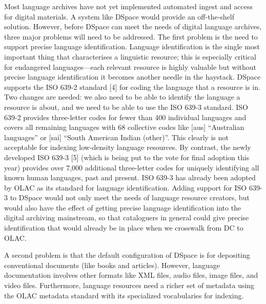 Most language archives have not yet implemented automated ingest and
access for digital materials.  A system like DSpace would provide 
an off-the-shelf solution.  
However, before DSpace can meet the needs of digital language archives,
three major problems will need to be addressed.
The first problem is the need to support precise language identification.
Language identification is the single most important thing that
characterises a linguistic resource; this is especially critical for
endangered languages---each relevant resource is highly valuable but
without precise language identification it becomes another needle in
the haystack. DSpace supports the ISO 639-2 standard [4] for coding the
language that a resource is in. Two changes are needed: we also need
to be able to identify the language a resource is about, and we need
to be able to use the ISO 639-3 standard.  ISO 639-2 provides
three-letter codes for fewer than 400 individual languages and covers all
remaining languages with 68 collective codes like [aus] ``Australian 
languages'' or [sai] ``South American Indian (other)''.  This clearly
is not acceptable for indexing low-density language resources.
By contrast, the newly developed ISO 639-3 [5] (which is being put to
the vote for final adoption this year) provides over 7,000 additional
three-letter codes for uniquely identifying all known human languages,
past and present.  ISO 639-3 has already been adopted by OLAC as its
standard for language identification.
Adding support for ISO 639-3 to DSpace would not only meet the
needs of language resource creators, but would also have the
effect of getting precise language identification into the 
digital archiving mainstream, so that cataloguers in general could
give precise identification that would already be in place
when we crosswalk from DC to OLAC.



A second problem is that the default configuration of DSpace
is for depositing conventional documents (like books and articles).
However, language documentation involves other formats like
XML files, audio files, image files, and video files. Furthermore,
language resources need a richer set of metadata using the OLAC 
metadata standard with its specialized vocabularies for indexing.

